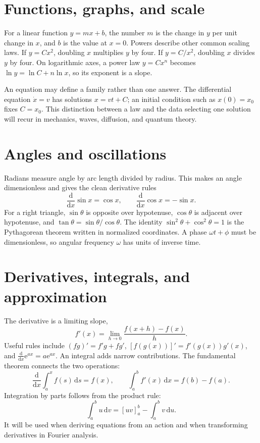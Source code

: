 \documentclass[11pt,oneside]{book}
\newcommand{\dd}{\mathrm{d}}
\newcommand{\ee}{\mathrm{e}}
\newcommand{\od}[2]{\frac{\dd #1}{\dd #2}}
\theoremstyle{reviewstyle}
\begin{document}
\section{Functions, graphs, and scale}
For a linear function $y=mx+b$, the number $m$ is the change in $y$ per unit change in $x$, and $b$ is the value at $x=0$. Powers describe other common scaling laws. If $y=Cx^2$, doubling $x$ multiplies $y$ by four. If $y=C/x^2$, doubling $x$ divides $y$ by four. On logarithmic axes, a power law $y=Cx^n$ becomes $\ln y=\ln C+n\ln x$, so its exponent is a slope.

An equation may define a family rather than one answer. The differential equation $\dot x=v$ has solutions $x=vt+C$; an initial condition such as $x(0)=x_0$ fixes $C=x_0$. This distinction between a law and the data selecting one solution will recur in mechanics, waves, diffusion, and quantum theory.

\section{Angles and oscillations}
Radians measure angle by arc length divided by radius. This makes an angle dimensionless and gives the clean derivative rules
\begin{equation}
\od{}{x}\sin x=\cos x,\qquad \od{}{x}\cos x=-\sin x.
\end{equation}
For a right triangle, $\sin\theta$ is opposite over hypotenuse, $\cos\theta$ is adjacent over hypotenuse, and $\tan\theta=\sin\theta/\cos\theta$. The identity $\sin^2\theta+\cos^2\theta=1$ is the Pythagorean theorem written in normalized coordinates. A phase $\omega t+\phi$ must be dimensionless, so angular frequency $\omega$ has units of inverse time.

\section{Derivatives, integrals, and approximation}
The derivative is a limiting slope,
\begin{equation}
f'(x)=\lim_{h\to0}\frac{f(x+h)-f(x)}h.
\end{equation}
Useful rules include $(fg)'=f'g+fg'$, $[f(g(x))]'=f'(g(x))g'(x)$, and $\od{}{x}\ee^{ax}=a\ee^{ax}$. An integral adds narrow contributions. The fundamental theorem connects the two operations:
\begin{equation}
\od{}{x}\int_a^x f(s)\,\dd s=f(x),\qquad
\int_a^b f'(x)\,\dd x=f(b)-f(a).
\end{equation}
Integration by parts follows from the product rule:
\begin{equation}
\int_a^b u\,\dd v=[uv]_a^b-\int_a^b v\,\dd u.
\end{equation}
It will be used when deriving equations from an action and when transforming derivatives in Fourier analysis.
\end{document}

